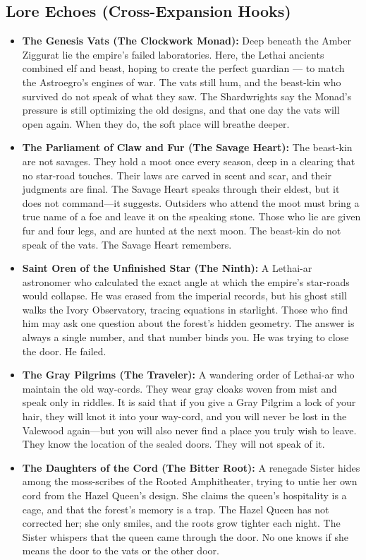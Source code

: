\subsection*{Lore Echoes (Cross-Expansion Hooks)}
\begin{itemize}
  \item \textbf{The Genesis Vats (The Clockwork Monad):} Deep beneath the Amber Ziggurat lie the empire's failed laboratories. Here, the Lethai ancients combined elf and beast, hoping to create the perfect guardian --- to match the Astroegro's engines of war. The vats still hum, and the beast-kin who survived do not speak of what they saw. The Shardwrights say the Monad's pressure is still optimizing the old designs, and that one day the vats will open again. When they do, the soft place will breathe deeper.
  \item \textbf{The Parliament of Claw and Fur (The Savage Heart):} The beast-kin are not savages. They hold a moot once every season, deep in a clearing that no star-road touches. Their laws are carved in scent and scar, and their judgments are final. The Savage Heart speaks through their eldest, but it does not command---it suggests. Outsiders who attend the moot must bring a true name of a foe and leave it on the speaking stone. Those who lie are given fur and four legs, and are hunted at the next moon. The beast-kin do not speak of the vats. The Savage Heart remembers.
  \item \textbf{Saint Oren of the Unfinished Star (The Ninth):} A Lethai-ar astronomer who calculated the exact angle at which the empire's star-roads would collapse. He was erased from the imperial records, but his ghost still walks the Ivory Observatory, tracing equations in starlight. Those who find him may ask one question about the forest's hidden geometry. The answer is always a single number, and that number binds you. He was trying to close the door. He failed.
  \item \textbf{The Gray Pilgrims (The Traveler):} A wandering order of Lethai-ar who maintain the old way-cords. They wear gray cloaks woven from mist and speak only in riddles. It is said that if you give a Gray Pilgrim a lock of your hair, they will knot it into your way-cord, and you will never be lost in the Valewood again---but you will also never find a place you truly wish to leave. They know the location of the sealed doors. They will not speak of it.
  \item \textbf{The Daughters of the Cord (The Bitter Root):} A renegade Sister hides among the moss-scribes of the Rooted Amphitheater, trying to untie her own cord from the Hazel Queen's design. She claims the queen's hospitality is a cage, and that the forest's memory is a trap. The Hazel Queen has not corrected her; she only smiles, and the roots grow tighter each night. The Sister whispers that the queen came through the door. No one knows if she means the door to the vats or the other door.

\end{itemize}
